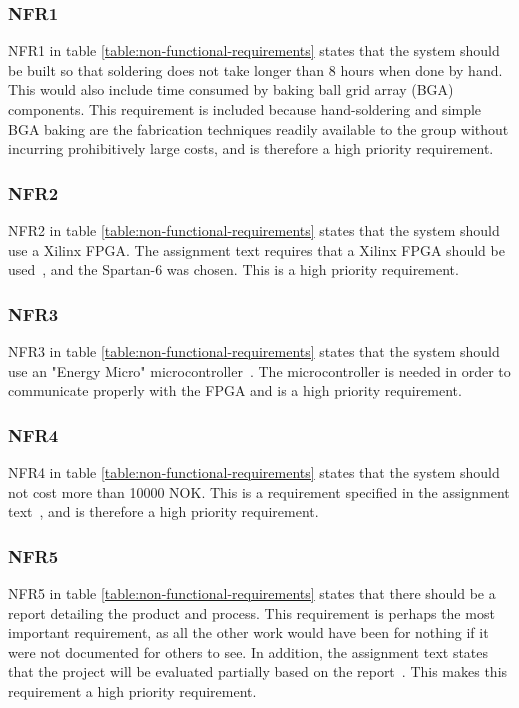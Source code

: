 \subsubsection{NFR1}

NFR1 in table \vref{table:non-functional-requirements} states that the system should be built so that soldering does not take longer than 8 hours when done by hand.
This would also include time consumed by baking ball grid array (BGA) components.
This requirement is included because hand-soldering and simple BGA baking are the fabrication techniques readily available to the group without incurring prohibitively large costs, and is therefore a high priority requirement.

\subsubsection{NFR2}

NFR2 in table \vref{table:non-functional-requirements} states that the system should use a Xilinx FPGA.
The assignment text requires that a Xilinx FPGA should be used~\cite{assignment-text}, and the Spartan-6 was chosen.
This is a high priority requirement. 

\subsubsection{NFR3}

NFR3 in table \vref{table:non-functional-requirements} states that the system should use an "Energy Micro" microcontroller~\cite{assignment-text}.
The microcontroller is needed in order to communicate properly with the FPGA and is a high priority requirement.


\subsubsection{NFR4}

NFR4 in table \vref{table:non-functional-requirements} states that the system should not cost more than 10000 NOK.
This is a requirement specified in the assignment text~\cite{assignment-text}, and is therefore a high priority requirement.

\subsubsection{NFR5}

NFR5 in table \vref{table:non-functional-requirements} states that there should be a report detailing the product and process.
This requirement is perhaps the most important requirement, as all the other work would have been for nothing if it were not documented for others to see.
In addition, the assignment text states that the project will be evaluated partially based on the report~\cite{assignment-text}.
This makes this requirement a high priority requirement.

